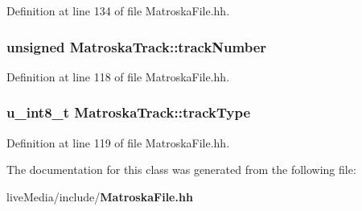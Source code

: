 Definition at line 134 of file Matroska\+File.\+hh.

\subsubsection[{track\+Number}]{\setlength{\rightskip}{0pt plus 5cm}unsigned Matroska\+Track\+::track\+Number}\label{classMatroskaTrack_ae4b3028d4069aa9af4f201af3c80126a}


Definition at line 118 of file Matroska\+File.\+hh.

\subsubsection[{track\+Type}]{\setlength{\rightskip}{0pt plus 5cm}u\+\_\+int8\+\_\+t Matroska\+Track\+::track\+Type}\label{classMatroskaTrack_ac4f0f71c5f35bb408a79e807df991cd7}


Definition at line 119 of file Matroska\+File.\+hh.



The documentation for this class was generated from the following file\+:\begin{DoxyCompactItemize}
\item 
live\+Media/include/{\bf Matroska\+File.\+hh}\end{DoxyCompactItemize}
